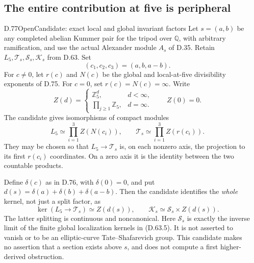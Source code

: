 \subsection{The entire contribution at five is peripheral}

\begin{statement}{D.77}{Open}{Candidate: exact local and global invariant factors}
Let \(s=(a,b)\) be any completed abelian Kummer pair for the tripod over
\(\mathbb Q\), with arbitrary ramification, and use the actual Alexander
module \(A_s\) of D.35. Retain \(L_5,\mathcal T_s,\mathcal S_s,\mathcal K_s\)
from D.63. Set
\[
 (c_1,c_2,c_3)=(a,b,a-b).
\]
For \(c\ne0\), let \(r(c)\) and \(N(c)\) be the global and local-at-five
divisibility exponents of D.75. For \(c=0\), set \(r(c)=N(c)=\infty\).
Write
\[
 Z(d)=
 \begin{cases}
 \mathbb Z_5^d,&d<\infty,\\
 \displaystyle\prod_{j\ge1}\mathbb Z_5,&d=\infty .
 \end{cases}
 \qquad Z(0)=0.                                      \tag{D.77.1}
\]
The candidate gives isomorphisms of compact modules
\[
 L_5\simeq\prod_{i=1}^3 Z(N(c_i)),\qquad
 \mathcal T_s\simeq\prod_{i=1}^3 Z(r(c_i)).             \tag{D.77.2}
\]
They may be chosen so that \(L_5\to\mathcal T_s\) is, on each nonzero
axis, the projection to its first \(r(c_i)\) coordinates. On a zero
axis it is the identity between the two countable products.

Define \(\delta(c)\) as in D.76, with \(\delta(0)=0\), and put
\(d(s)=\delta(a)+\delta(b)+\delta(a-b)\). Then the candidate identifies
the \emph{whole} kernel, not just a split factor, as
\[
 \ker(L_5\longrightarrow\mathcal T_s)\simeq Z(d(s)),
 \qquad
 \mathcal K_s\simeq\mathcal S_s\times Z(d(s)).          \tag{D.77.3}
\]
The latter splitting is continuous and noncanonical.
Here \(\mathcal S_s\) is exactly the inverse limit of the finite
global localization kernels in (D.63.5). It is not asserted to vanish
or to be an elliptic-curve Tate--Shafarevich group.
This candidate makes no assertion that a section exists above \(s\),
and does not compute a first higher-derived obstruction.
\end{statement}

